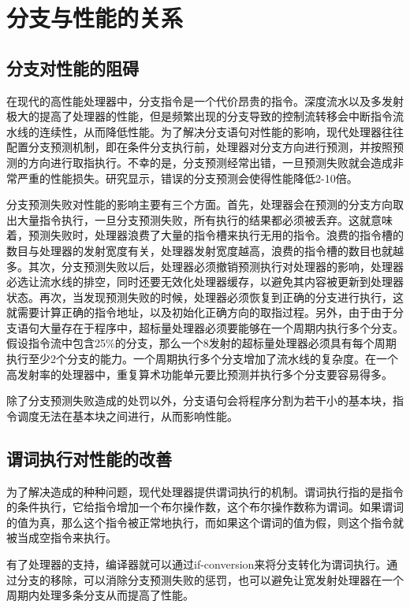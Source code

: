\section{分支与性能的关系}

\subsection{分支对性能的阻碍}

在现代的高性能处理器中，分支指令是一个代价昂贵的指令\cite{Mahlke1994}。深度流水以及多发射极大的提高了处理器的性能，但是频繁出现的分支导致的控制流转移会中断指令流水线的连续性，从而降低性能。为了解决分支语句对性能的影响，现代处理器往往配置分支预测机制，即在条件分支执行前，处理器对分支方向进行预测，并按照预测的方向进行取指执行。不幸的是，分支预测经常出错，一旦预测失败就会造成非常严重的性能损失。研究显示，错误的分支预测会使得性能降低2-10倍\cite{Smith1989}\cite{Wall1991}\cite{1991}。

分支预测失败对性能的影响主要有三个方面。首先，处理器会在预测的分支方向取出大量指令执行，一旦分支预测失败，所有执行的结果都必须被丢弃。这就意味着，预测失败时，处理器浪费了大量的指令槽来执行无用的指令。浪费的指令槽的数目与处理器的发射宽度有关，处理器发射宽度越高，浪费的指令槽的数目也就越多。其次，分支预测失败以后，处理器必须撤销预测执行对处理器的影响，处理器必选让流水线的排空，同时还要无效化处理器缓存，以避免其内容被更新到处理器状态。再次，当发现预测失败的时候，处理器必须恢复到正确的分支进行执行，这就需要计算正确的指令地址，以及初始化正确方向的取指过程。另外，由于由于分支语句大量存在于程序中，超标量处理器必须要能够在一个周期内执行多个分支。假设指令流中包含25\%的分支，那么一个8发射的超标量处理器必须具有每个周期执行至少2个分支的能力。一个周期执行多个分支增加了流水线的复杂度。在一个高发射率的处理器中，重复算术功能单元要比预测并执行多个分支要容易得多。

除了分支预测失败造成的处罚以外，分支语句会将程序分割为若干小的基本块，指令调度无法在基本块之间进行，从而影响性能。


\subsection{谓词执行对性能的改善}

为了解决造成的种种问题，现代处理器提供谓词执行的机制。谓词执行指的是指令的条件执行，它给指令增加一个布尔操作数，这个布尔操作数称为谓词。如果谓词的值为真，那么这个指令被正常地执行，而如果这个谓词的值为假，则这个指令就被当成空指令来执行。

有了处理器的支持，编译器就可以通过if-conversion来将分支转化为谓词执行。通过分支的移除，可以消除分支预测失败的惩罚，也可以避免让宽发射处理器在一个周期内处理多条分支从而提高了性能。

